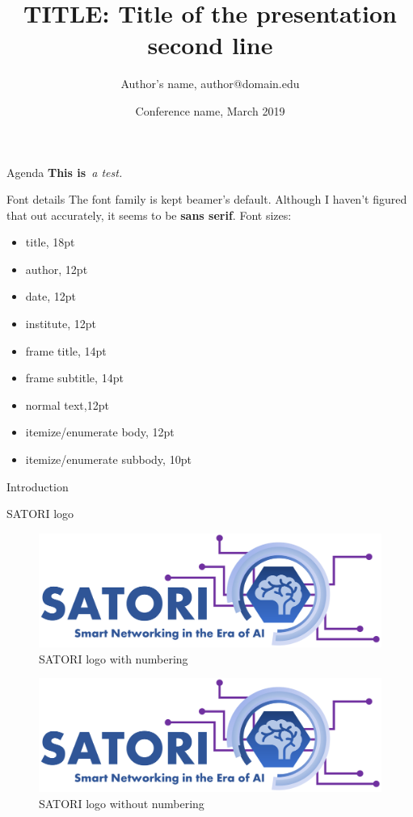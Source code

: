 \documentclass[aspectratio=169,t]{beamer}
\title{TITLE: Title of the presentation\\second line}
\author{Author's name, author@domain.edu}
\institute{University of affiliation}
\date{Conference name, March 2019}
\begin{document}
{
    \maketitle
}
\addtocounter{framenumber}{-1}


\begin{frame}{Agenda}
    \textbf{This is}\emph{~a test.}
    \blindenumerate[5]
\end{frame}

\begin{frame}{Font details}
The font family is kept beamer's default. Although I haven't figured that out accurately, it seems to be \textbf{sans serif}.
\vfill
Font sizes:
\begin{itemize}
    \item title, 18pt
    \item author, 12pt
    \item date, 12pt
    \item institute, 12pt
    \item frame title, 14pt
    \item frame subtitle, 14pt
    \item normal text,12pt
    \item itemize/enumerate body, 12pt
    \item itemize/enumerate subbody, 10pt
\end{itemize}
\end{frame}

\begin{frame}{Introduction}
    \blindenumerate[5]
\end{frame}

\begin{frame}{SATORI logo}
    \begin{figure}
        \centering
        \includegraphics[width=0.3\linewidth]{logos/satori-big-logo.pdf}
        \caption{SATORI logo with numbering}
    \end{figure}
    
    \begin{figure}
        \centering
        \includegraphics[width=0.3\linewidth]{logos/satori-big-logo.pdf}
        \caption*{SATORI logo without numbering}
    \end{figure}
\end{frame}
\end{document}
